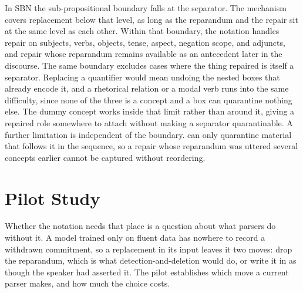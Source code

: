 \documentclass{article}
\begin{document}
In SBN the sub-propositional boundary falls at the separator. The mechanism
covers replacement below that level, as long as the reparandum and the repair
sit at the same level as each other.
Within that boundary, the notation handles repair on subjects, verbs, objects,
tense, aspect, negation scope, and adjuncts, and repair whose reparandum remains
available as an antecedent later in the discourse. The same boundary excludes
cases where the thing repaired is itself a separator. Replacing a quantifier would
mean undoing the nested  boxes that already encode it, and a
rhetorical relation or a modal verb runs into the same difficulty, since none of
the three is a concept and a  box can quarantine nothing
else. The dummy concept works inside that limit rather than
around it, giving a repaired role somewhere to attach without making a separator
quarantinable. A further limitation is independent of the boundary.
 can only quarantine material that follows it in the sequence,
so a repair whose reparandum was uttered several concepts earlier cannot be
captured without reordering.

\section{Pilot Study}
\label{sec:pilot}

Whether the notation needs that place is a question about what parsers do without
it. A model trained only on fluent data has nowhere to record a withdrawn
commitment, so a replacement in its input leaves it two moves: drop the
reparandum, which is what detection-and-deletion would do, or write it in as
though the speaker had asserted it. The pilot establishes which move a current
parser makes, and how much the choice costs.
\end{document}
